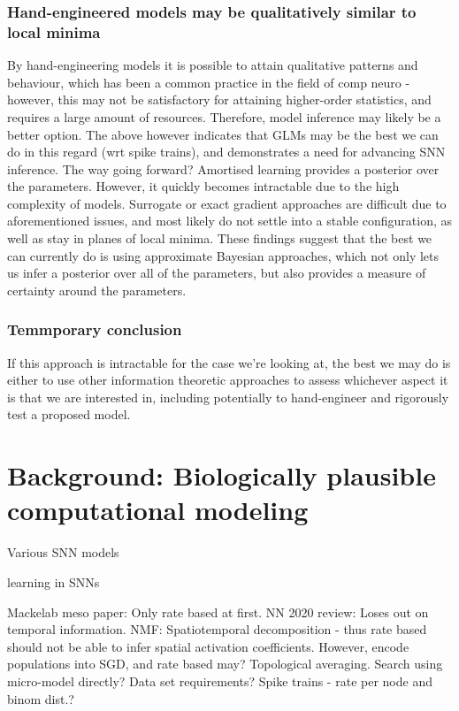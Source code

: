 \documentclass[mphil,deptreport,ai]{infthesis} %
\begin{document}
\subsection{Hand-engineered models may be qualitatively similar to local minima}
By hand-engineering models it is possible to attain qualitative patterns and behaviour, which has been a common practice in the field of comp neuro - however, this may not be satisfactory for attaining higher-order statistics, and requires a large amount of resources. Therefore, model inference may likely be a better option. 
The above however indicates that GLMs may be the best we can do in this regard (wrt spike trains), and demonstrates a need for advancing SNN inference.
The way going forward?
Amortised learning provides a posterior over the parameters.
However, it quickly becomes intractable due to the high complexity of models.
Surrogate or exact gradient approaches are difficult due to aforementioned issues, and most likely do not settle into a stable configuration, as well as stay in planes of local minima.
These findings suggest that the best we can currently do is using approximate Bayesian approaches, which not only lets us infer a posterior over all of the parameters, but also provides a measure of certainty around the parameters.

\subsection{Temmporary conclusion}
If this approach is intractable for the case we’re looking at, the best we may do is either to use other information theoretic approaches to assess whichever aspect it is that we are interested in, including potentially to hand-engineer and rigorously test a proposed model.

\chapter{Background: Biologically plausible computational modeling}

Various SNN models

\cite{Taherkhani2020} learning in SNNs

Mackelab meso paper: Only rate based at first.
NN 2020 review: Loses out on temporal information.
NMF: Spatiotemporal decomposition - thus rate based should not be able to infer spatial activation coefficients. However, encode populations into SGD, and rate based may? 
Topological averaging.
Search using micro-model directly? Data set requirements? Spike trains - rate per node and binom dist.?
\end{document}
